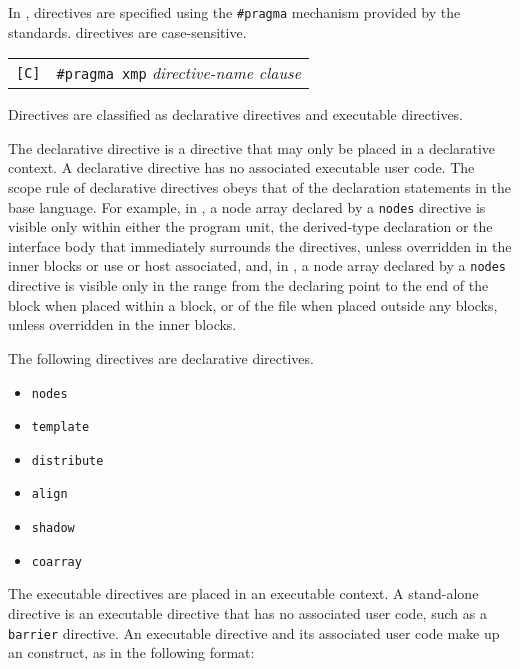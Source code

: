\vspace{0.5cm}

In {\XMPC}, {\XMP} directives are specified using the \verb|#pragma|
mechanism provided by the {\C} standards. {\XMPC} directives are
case-sensitive.

\vspace{0.5cm}

\begin{tabular}{ll}
\verb![C]! & \verb|#pragma xmp| {\it directive-name clause} \\
\end{tabular}

\vspace{0.5cm}


Directives are classified as declarative directives and executable
directives.

The declarative directive is a directive that may only be
placed in a declarative context. A declarative directive has no
associated executable user code. The scope rule of declarative
directives obeys that of the declaration statements in the base
language.
%
For example, in {\XMPF}, a node array declared by a {\tt nodes}
directive is visible only within either the program unit, the
derived-type declaration or the interface body that immediately
surrounds the directives, unless overridden in the inner blocks or use
or host associated,
%
and, in {\XMPC}, a node array declared by a {\tt nodes} directive is
visible only in the range from the declaring point to the end of 
the block when placed within a block, or of the file when
placed outside any blocks, unless overridden in the inner blocks.
%


The following directives are declarative directives.

\begin{itemize}
 \item {\tt nodes}
 \item {\tt template}
 \item {\tt distribute}
 \item {\tt align}
 \item {\tt shadow}
 \item {\tt coarray}
\end{itemize}

The executable directives are placed in an executable context. A
stand-alone directive is an executable directive that has no associated
user code, such as a {\tt barrier} directive.
%
An executable directive and its associated user code make up an
{\XMP} construct, as in the following format:

